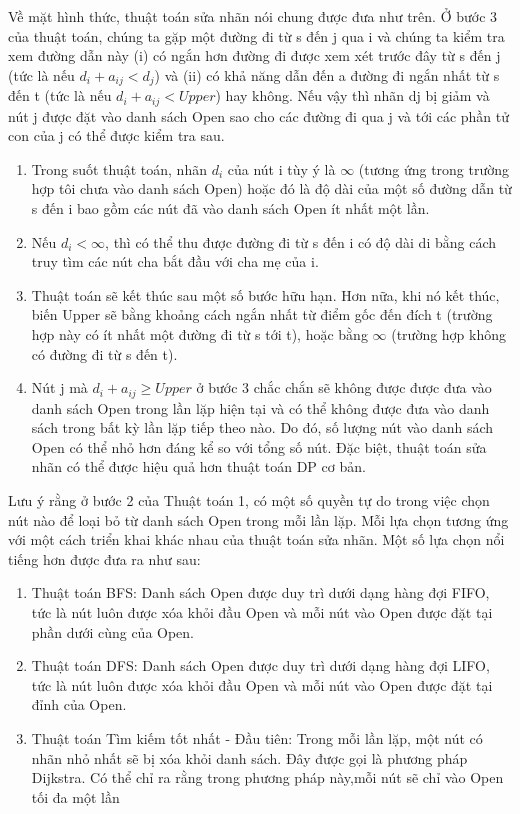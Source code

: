 \documentclass[a4paper]{article}
\begin{document}
    Về mặt hình thức, thuật toán sửa nhãn nói chung được đưa như trên.
    Ở bước 3 của thuật toán, chúng ta gặp một đường đi từ s đến j qua i và chúng ta kiểm tra xem đường dẫn này (i) có ngắn hơn đường đi được xem xét trước đây từ s đến j (tức là nếu 
    $d_i + a_{ij} < d_j$) và (ii) có khả năng dẫn đến a
    đường đi ngắn nhất từ s đến t (tức là nếu $d_i + a_{ij} < Upper$) hay không. 
    Nếu vậy thì nhãn dj bị giảm và nút j được đặt vào danh sách Open sao cho các đường đi qua j và tới các phần tử con của j có thể được kiểm tra sau.
    \begin{enumerate}
        \item Trong suốt thuật toán, nhãn $d_i$ của nút i tùy ý là $\infty$ (tương ứng
        trong trường hợp tôi chưa vào danh sách Open) hoặc đó là độ dài của một số đường dẫn từ s đến i bao gồm các nút đã vào danh sách Open ít nhất một lần.
        \item Nếu $d_i < \infty$, thì có thể thu được đường đi từ s đến i có độ dài di bằng cách truy tìm các nút cha bắt đầu với cha mẹ của i.
        \item Thuật toán sẽ kết thúc sau một số bước hữu hạn. Hơn nữa, khi nó kết thúc,
        biến Upper sẽ bằng khoảng cách ngắn nhất từ điểm gốc đến đích t (trường hợp này có ít nhất một đường đi từ s tới t), hoặc bằng 
        $\infty$ (trường hợp không có đường đi từ s đến t). 
        \item Nút j mà $d_i + a_{ij} \geq Upper$ ở bước 3 chắc chắn sẽ không được được đưa vào danh sách Open trong lần lặp hiện tại và có thể không được đưa vào danh sách trong bất kỳ lần lặp tiếp theo nào. 
        Do đó, số lượng nút vào danh sách Open có thể nhỏ hơn đáng kể so với tổng số nút. Đặc biệt, thuật toán sửa nhãn có thể được hiệu quả hơn thuật toán DP cơ bản.
    \end{enumerate}

    Lưu ý rằng ở bước 2 của Thuật toán 1, có một số quyền tự do trong việc chọn nút nào để loại bỏ từ danh sách Open trong mỗi lần lặp. Mỗi lựa chọn tương ứng với một cách triển khai khác nhau của thuật toán sửa nhãn. 
    Một số lựa chọn nổi tiếng hơn được đưa ra như sau:
    \begin{enumerate}
        \item Thuật toán BFS: Danh sách Open được duy trì dưới dạng hàng đợi FIFO,
            tức là nút luôn được xóa khỏi đầu Open và mỗi nút vào Open được đặt tại phần dưới cùng của Open.
        \item Thuật toán DFS: Danh sách Open được duy trì dưới dạng hàng đợi LIFO,
            tức là nút luôn được xóa khỏi đầu Open và mỗi nút vào Open được đặt tại đỉnh của Open.
        \item Thuật toán Tìm kiếm tốt nhất - Đầu tiên: Trong mỗi lần lặp, một nút có nhãn nhỏ nhất sẽ bị xóa khỏi danh sách. Đây được gọi là phương pháp Dijkstra. Có thể chỉ ra rằng trong phương pháp này,mỗi nút sẽ chỉ vào Open tối đa một lần
    \end{enumerate}
\end{document}
